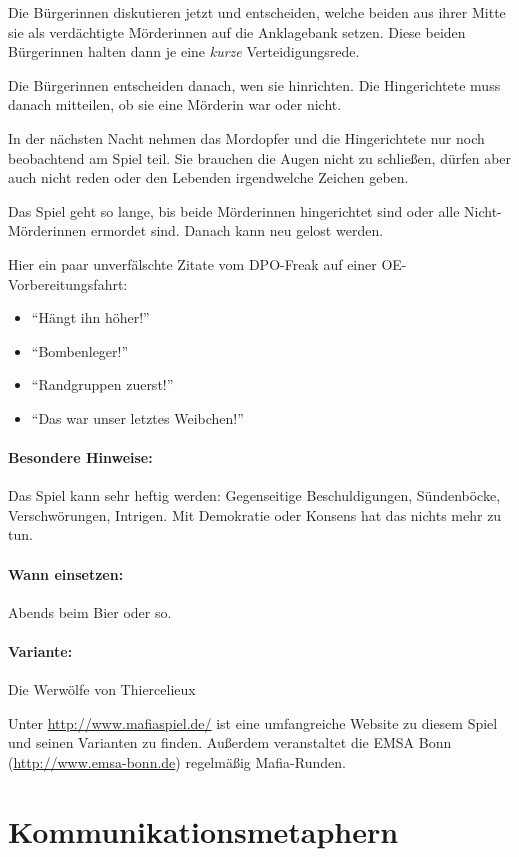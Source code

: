 Die Bürgerinnen diskutieren jetzt und entscheiden, welche beiden aus ihrer Mitte sie als verdächtigte Mörderinnen auf die Anklagebank setzen. Diese beiden Bürgerinnen halten dann je eine \emph{kurze} Verteidigungsrede.

Die Bürgerinnen entscheiden danach, wen sie hinrichten. Die Hingerichtete muss danach mitteilen, ob sie eine Mörderin war oder nicht.

In der nächsten Nacht nehmen das Mordopfer und die Hingerichtete nur noch beobachtend am Spiel teil. Sie brauchen die Augen nicht zu schließen, dürfen aber auch nicht reden oder den Lebenden irgendwelche Zeichen geben.

Das Spiel geht so lange, bis beide Mörderinnen hingerichtet sind oder alle Nicht-Mörderinnen ermordet sind. Danach kann neu gelost werden.

Hier ein paar unverfälschte Zitate vom DPO-Freak auf einer OE-Vorbereitungsfahrt:
\begin{itemize}
  \item "`Hängt ihn höher!"'
  \item "`Bombenleger!"'
  \item "`Randgruppen zuerst!"'
  \item "`Das war unser letztes Weibchen!"'
\end{itemize}

\paragraph{Besondere Hinweise:} Das Spiel kann sehr heftig werden: Gegenseitige Beschuldigungen, Sündenböcke, Verschwörungen, Intrigen. Mit Demokratie oder Konsens hat das nichts mehr zu tun.
\paragraph{Wann einsetzen:} Abends beim Bier oder so.
\paragraph{Variante:} Die Werwölfe von Thiercelieux

Unter \url{http://www.mafiaspiel.de/} ist eine umfangreiche Website zu diesem Spiel und seinen Varianten zu finden. Außerdem veranstaltet die EMSA Bonn (\url{http://www.emsa-bonn.de}) regelmäßig Mafia-Runden.

\section{Kommunikationsmetaphern}
